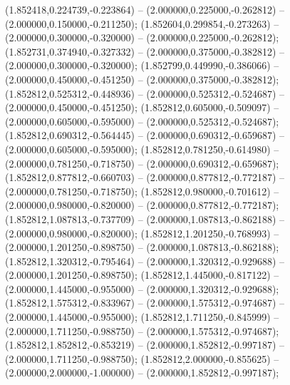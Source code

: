  (1.852418,0.224739,-0.223864) -- (2.000000,0.225000,-0.262812) -- (2.000000,0.150000,-0.211250);
 (1.852604,0.299854,-0.273263) -- (2.000000,0.300000,-0.320000) -- (2.000000,0.225000,-0.262812);
 (1.852731,0.374940,-0.327332) -- (2.000000,0.375000,-0.382812) -- (2.000000,0.300000,-0.320000);
 (1.852799,0.449990,-0.386066) -- (2.000000,0.450000,-0.451250) -- (2.000000,0.375000,-0.382812);
 (1.852812,0.525312,-0.448936) -- (2.000000,0.525312,-0.524687) -- (2.000000,0.450000,-0.451250);
 (1.852812,0.605000,-0.509097) -- (2.000000,0.605000,-0.595000) -- (2.000000,0.525312,-0.524687);
 (1.852812,0.690312,-0.564445) -- (2.000000,0.690312,-0.659687) -- (2.000000,0.605000,-0.595000);
 (1.852812,0.781250,-0.614980) -- (2.000000,0.781250,-0.718750) -- (2.000000,0.690312,-0.659687);
 (1.852812,0.877812,-0.660703) -- (2.000000,0.877812,-0.772187) -- (2.000000,0.781250,-0.718750);
 (1.852812,0.980000,-0.701612) -- (2.000000,0.980000,-0.820000) -- (2.000000,0.877812,-0.772187);
 (1.852812,1.087813,-0.737709) -- (2.000000,1.087813,-0.862188) -- (2.000000,0.980000,-0.820000);
 (1.852812,1.201250,-0.768993) -- (2.000000,1.201250,-0.898750) -- (2.000000,1.087813,-0.862188);
 (1.852812,1.320312,-0.795464) -- (2.000000,1.320312,-0.929688) -- (2.000000,1.201250,-0.898750);
 (1.852812,1.445000,-0.817122) -- (2.000000,1.445000,-0.955000) -- (2.000000,1.320312,-0.929688);
 (1.852812,1.575312,-0.833967) -- (2.000000,1.575312,-0.974687) -- (2.000000,1.445000,-0.955000);
 (1.852812,1.711250,-0.845999) -- (2.000000,1.711250,-0.988750) -- (2.000000,1.575312,-0.974687);
 (1.852812,1.852812,-0.853219) -- (2.000000,1.852812,-0.997187) -- (2.000000,1.711250,-0.988750);
 (1.852812,2.000000,-0.855625) -- (2.000000,2.000000,-1.000000) -- (2.000000,1.852812,-0.997187);
